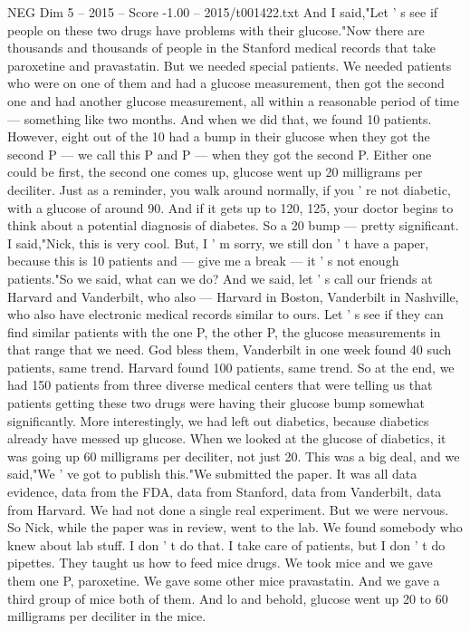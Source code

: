\begin{textsample}{NEG Dim 5 – 2015 – Score -1.00 – 2015/t001422.txt}
And I said,"Let ' s see if people on these two drugs have problems with their glucose."Now there are thousands and thousands of people in the Stanford medical records that take paroxetine and pravastatin.
But we needed special patients.
We needed patients who were on one of them and had a glucose measurement, then got the second one and had another glucose measurement, all within a reasonable period of time — something like two months.
And when we did that, we found 10 patients.
However, eight out of the 10 had a bump in their glucose when they got the second P — we call this P and P — when they got the second P.
Either one could be first, the second one comes up, glucose went up 20 milligrams per deciliter.
Just as a reminder, you walk around normally, if you ' re not diabetic, with a glucose of around 90.
And if it gets up to 120, 125, your doctor begins to think about a potential diagnosis of diabetes.
So a 20 bump — pretty significant.
I said,"Nick, this is very cool.
But, I ' m sorry, we still don ' t have a paper, because this is 10 patients and — give me a break — it ' s not enough patients."So we said, what can we do?
And we said, let ' s call our friends at Harvard and Vanderbilt, who also — Harvard in Boston, Vanderbilt in Nashville, who also have electronic medical records similar to ours.
Let ' s see if they can find similar patients with the one P, the other P, the glucose measurements in that range that we need.
God bless them, Vanderbilt in one week found 40 such patients, same trend.
Harvard found 100 patients, same trend.
So at the end, we had 150 patients from three diverse medical centers that were telling us that patients getting these two drugs were having their glucose bump somewhat significantly.
More interestingly, we had left out diabetics, because diabetics already have messed up glucose.
When we looked at the glucose of diabetics, it was going up 60 milligrams per deciliter, not just 20.
This was a big deal, and we said,"We ' ve got to publish this."We submitted the paper.
It was all data evidence, data from the FDA, data from Stanford, data from Vanderbilt, data from Harvard.
We had not done a single real experiment.
But we were nervous.
So Nick, while the paper was in review, went to the lab.
We found somebody who knew about lab stuff.
I don ' t do that.
I take care of patients, but I don ' t do pipettes.
They taught us how to feed mice drugs.
We took mice and we gave them one P, paroxetine.
We gave some other mice pravastatin.
And we gave a third group of mice both of them.
And lo and behold, glucose went up 20 to 60 milligrams per deciliter in the mice.

\end{textsample}
